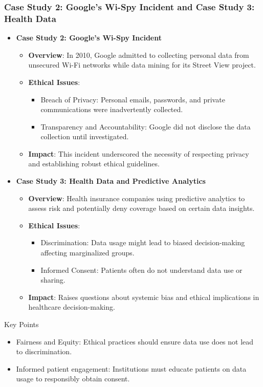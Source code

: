 \documentclass[aspectratio=169]{beamer}
\begin{document}
\begin{frame}[fragile]
  \frametitle{Case Study 2: Google’s Wi-Spy Incident and Case Study 3: Health Data}
  \begin{itemize}
    \item \textbf{Case Study 2: Google’s Wi-Spy Incident}
      \begin{itemize}
        \item \textbf{Overview}: In 2010, Google admitted to collecting personal data from unsecured Wi-Fi networks while data mining for its Street View project.
        \item \textbf{Ethical Issues}:
          \begin{itemize}
            \item Breach of Privacy: Personal emails, passwords, and private communications were inadvertently collected.
            \item Transparency and Accountability: Google did not disclose the data collection until investigated.
          \end{itemize}
        \item \textbf{Impact}: This incident underscored the necessity of respecting privacy and establishing robust ethical guidelines.
      \end{itemize}

    \item \textbf{Case Study 3: Health Data and Predictive Analytics}
      \begin{itemize}
        \item \textbf{Overview}: Health insurance companies using predictive analytics to assess risk and potentially deny coverage based on certain data insights.
        \item \textbf{Ethical Issues}:
          \begin{itemize}
            \item Discrimination: Data usage might lead to biased decision-making affecting marginalized groups.
            \item Informed Consent: Patients often do not understand data use or sharing.
          \end{itemize}
        \item \textbf{Impact}: Raises questions about systemic bias and ethical implications in healthcare decision-making.
      \end{itemize}
  \end{itemize}
  
  \begin{block}{Key Points}
    \begin{itemize}
      \item Fairness and Equity: Ethical practices should ensure data use does not lead to discrimination.
      \item Informed patient engagement: Institutions must educate patients on data usage to responsibly obtain consent.
    \end{itemize}
  \end{block}
\end{frame}
\end{document}
